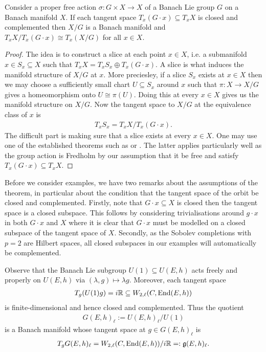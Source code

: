 \documentclass[12pt]{ociamthesis}  %
\begin{document}
\begin{theorem}\label{thm:banach_quotient}
  Consider a proper free action $\sigma : G\times X\to X$ of a Banach
  Lie group $G$ on a Banach manifold $X$. If each tangent space
  $T_x(G\cdot x) \subseteq T_x X$ is closed and complemented then
  $X/G$ is a Banach manifold and $T_x X/T_x (G\cdot x) \cong T_x(X/G)$
  for all $x\in X$.
  \begin{proof}
    The idea is to construct a slice at each point $x\in X$, i.e. a submanifold
    $x\in S_x\subseteq X$ such that $T_x X = T_xS_x \oplus T_x(G\cdot x)$. A slice is
    what induces the manifold structure of $X/G$ at $x$. More preciesley, if a slice
    $S_x$ exists at $x\in X$ then we may choose a sufficiently small chart $U\subseteq S_x$
    around $x$ such that $\pi : X \to X/G$ gives a homeomorphism onto $U\cong\pi(U)$. Doing this
    at every $x\in X$ gives us the manifold structure on $X/G$. Now the tangent space
    to $X/G$ at the equivalence class of $x$ is
    \begin{align}\label{eq:banach_quotient_tangent}
      T_x S_x = T_x X / T_x (G\cdot x).
    \end{align}
    The difficult part is making sure that a slice exists at every $x\in X$. One may use
    one of the established theorems such as \cite[Theorem 3.28]{diez2019}
    or \cite[Theorem 5.2.6]{palais1992}. The latter applies particularly well
    as the group action is Fredholm by our assumption that it be free and satisfy
    $T_x(G\cdot x)\subseteq T_x X$.
  \end{proof}
\end{theorem}

Before we consider examples, we have two remarks about the assumptions of the theorem,
in particular about the condition that the tangent space of the orbit be closed and
complemented. Firstly, note that $G\cdot x \subseteq X$ is closed then the tangent
space is a closed subspace. This follows by considering trivialisations around $g\cdot x$
in both $G\cdot x$ and $X$ where it is clear that $G\cdot x$ must be modelled on a closed
subspace of the tangent space of $X$. Secondly, as the Sobolev completions with $p=2$ are
Hilbert spaces, all closed subspaces in our examples will automatically be complemented.

\begin{example}
  Observe that the Banach Lie subgroup $U(1)\subseteq U(E,h)$ acts freely and properly
  on $U(E,h)$ via $(\lambda,g)\mapsto \lambda g$. Moreover, each tangent space
  \begin{align*}
    T_g(U(1)g) =
    i\mathbb{R} \subseteq W_{2,\ell}(C,\operatorname{End}(E,h))
  \end{align*}
  is finite-dimensional and hence closed and complemented.  Thus the quotient
  \begin{align*}
    G(E,h)_{\ell} := U(E,h)_\ell / U(1)
  \end{align*}
  is a Banach manifold whose tangent space at $g\in G(E,h)_\ell$ is
  \begin{align*}
    T_g G(E,h)_\ell =  W_{2,\ell}(C,\operatorname{End}(E,h))/i\mathbb{R} =: \mathfrak g(E,h)_\ell.
  \end{align*}
\end{example}
\end{document}
